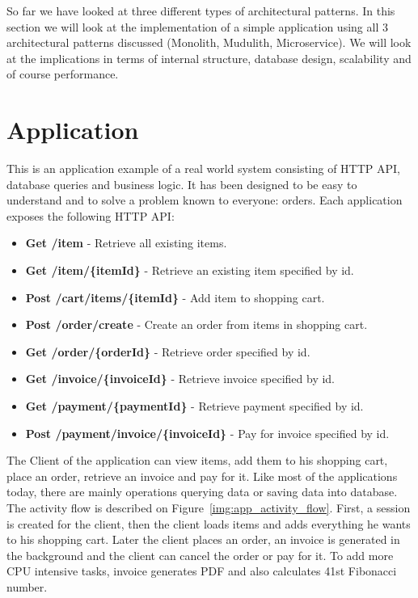 

So far we have looked at three different types of architectural patterns. In this section we will look at the implementation of a simple application using all 3 architectural patterns discussed (Monolith, Mudulith, Microservice). We will look at the implications in terms of internal structure, database design, scalability and of course performance.

\section{Application}
This is an application example of a real world system consisting of HTTP API, database queries and business logic. It has been designed to be easy to understand and to solve a problem known to everyone: orders. Each application exposes the following HTTP API:
\begin{itemize}
    \item \textbf{Get /item} - Retrieve all existing items.
    \item \textbf{Get /item/\{itemId\}} - Retrieve an existing item specified by id.
    \item \textbf{Post /cart/items/\{itemId\}} - Add item to shopping cart.
    \item \textbf{Post /order/create} - Create an order from items in shopping cart.
    \item \textbf{Get /order/\{orderId\}} - Retrieve order specified by id.
    \item \textbf{Get /invoice/\{invoiceId\}} - Retrieve invoice specified by id.
    \item \textbf{Get /payment/\{paymentId\}} - Retrieve payment specified by id.
    \item \textbf{Post /payment/invoice/\{invoiceId\}} - Pay for invoice specified by id.
\end{itemize}

The Client of the application can view items, add them to his shopping cart, place an order, retrieve an invoice and pay for it. Like most of the applications today, there are mainly operations querying data or saving data into database. The activity flow is described on Figure~\ref{img:app_activity_flow}. First, a session is created for the client, then the client loads items and adds everything he wants to his shopping cart. Later the client places an order, an invoice is generated in the background and the client can cancel the order or pay for it. To add more CPU intensive tasks, invoice generates PDF and also calculates 41st Fibonacci number.

